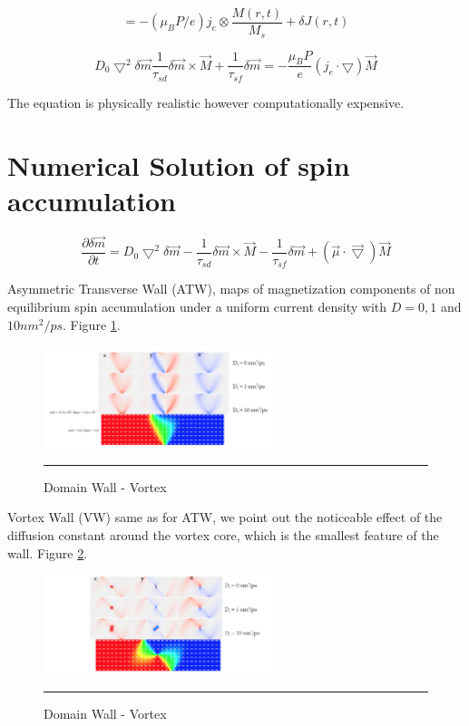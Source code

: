 \begin{equation}
=-(\mu_{B} P/e)j_{e} \otimes \frac{M(r,t)}{M_{s}} + \delta J(r,t)
\end{equation}


\begin{equation}
D_{0}\bigtriangledown^{2} \delta \vec{m}  \frac{1}{\tau_{sd}} \delta \vec{m} \times \vec{M} + \frac{1}{\tau_{sf}}\delta \vec{m} = -\frac{\mu_{B}P}{e}(j_{e} \cdot \bigtriangledown) \vec{M}
\end{equation}

The equation is physically realistic however computationally expensive.

\section{Numerical Solution of spin accumulation}

\begin{equation} \label{eq:zhang}
 \frac{\partial \delta \vec{m} }{\partial t} =  D_{0}\bigtriangledown^{2} \delta \vec{m} - \frac{1}{\tau_{sd}} \delta \vec{m} \times \vec{M} - \frac{1}{\tau_{sf}}\delta \vec{m} +(\vec{\mu} \cdot\vec{\bigtriangledown} )\vec{M}
\end{equation}


Asymmetric Transverse Wall (ATW), maps of magnetization components of non equilibrium spin accumulation under a uniform current density with $D = 0, 1$ and $10 nm^2 / ps$. Figure \ref{fig:atw}.

\begin{figure}[htbp]
	\centering
		\includegraphics[width=0.6\textwidth]{Figures/ATW.png}
		\rule{35em}{0.5pt}
	\caption[Domain Wall - Vortex]{Domain Wall - Vortex}
	\label{fig:atw}
\end{figure}

Vortex Wall (VW) same as for ATW, we point out the noticeable effect of the diffusion constant around the vortex core, which is the smallest feature of the wall. Figure \ref{fig:vw}.

\begin{figure}[htbp]
	\centering
		\includegraphics[width=0.6\textwidth]{Figures/VW.png}
		\rule{35em}{0.5pt}
	\caption[Domain Wall - Vortex]{Domain Wall - Vortex}
	\label{fig:vw}
\end{figure}



